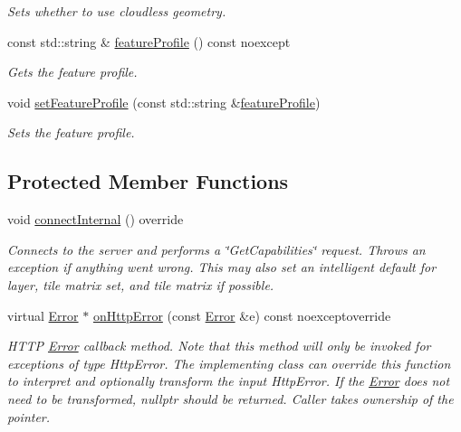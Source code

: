 \begin{DoxyCompactItemize}
\begin{DoxyCompactList}\small\item\em Sets whether to use cloudless geometry. \end{DoxyCompactList}\item 
const std\+::string \& \hyperlink{classdg_1_1deepcore_1_1imagery_1_1_dg_wmts_client_a70e018e8832c4c32a0089074cd1d0adb}{feature\+Profile} () const noexcept
\begin{DoxyCompactList}\small\item\em Gets the feature profile. \end{DoxyCompactList}\item 
void \hyperlink{classdg_1_1deepcore_1_1imagery_1_1_dg_wmts_client_a77b7384edff50a3f9f1fdb46319cb4ec}{set\+Feature\+Profile} (const std\+::string \&\hyperlink{classdg_1_1deepcore_1_1imagery_1_1_dg_wmts_client_a70e018e8832c4c32a0089074cd1d0adb}{feature\+Profile})
\begin{DoxyCompactList}\small\item\em Sets the feature profile. \end{DoxyCompactList}\end{DoxyCompactItemize}
\subsection*{Protected Member Functions}
\begin{DoxyCompactItemize}
\item 
void \hyperlink{classdg_1_1deepcore_1_1imagery_1_1_dg_wmts_client_a63828e25ea51f3c4bef0975d073d38f2}{connect\+Internal} () override
\begin{DoxyCompactList}\small\item\em Connects to the server and performs a \char`\"{}\+Get\+Capabilities\char`\"{} request. Throws an exception if anything went wrong. This may also set an intelligent default for layer, tile matrix set, and tile matrix if possible. \end{DoxyCompactList}\item 
virtual \hyperlink{classdg_1_1deepcore_1_1_error}{Error} $\ast$ \hyperlink{classdg_1_1deepcore_1_1imagery_1_1_dg_wmts_client_abce47a0dd9861f62a39d135dcf750cd0}{on\+Http\+Error} (const \hyperlink{classdg_1_1deepcore_1_1_error}{Error} \&e) const noexceptoverride
\begin{DoxyCompactList}\small\item\em H\+T\+TP \hyperlink{classdg_1_1deepcore_1_1_error}{Error} callback method. Note that this method will only be invoked for exceptions of type Http\+Error. The implementing class can override this function to interpret and optionally transform the input Http\+Error. If the \hyperlink{classdg_1_1deepcore_1_1_error}{Error} does not need to be transformed, nullptr should be returned. Caller takes ownership of the pointer. \end{DoxyCompactList}\end{DoxyCompactItemize}


